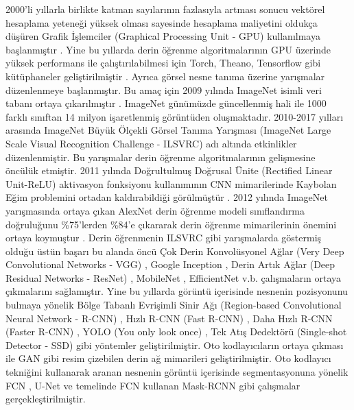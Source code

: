 2000'li yıllarla birlikte katman sayılarının fazlasıyla artması sonucu vektörel hesaplama yeteneği yüksek olması sayesinde hesaplama maliyetini oldukça düşüren Grafik İşlemciler (Graphical Processing Unit - GPU) kullanılmaya başlanmıştır \cite{raina2009large,cirecsan2010deep,sanders2010cuda}. Yine bu yıllarda derin öğrenme algoritmalarının GPU üzerinde yüksek performans ile çalıştırılabilmesi için Torch, Theano, Tensorflow gibi kütüphaneler geliştirilmiştir \cite{collobert2002torch,bergstra2010theano,abadi2016tensorflow,paszke2019pytorch}. Ayrıca görsel nesne tanıma üzerine yarışmalar düzenlenmeye başlanmıştır. Bu amaç için 2009 yılında ImageNet isimli veri tabanı ortaya çıkarılmıştır \cite{deng2009imagenet}. ImageNet günümüzde güncellenmiş hali ile 1000 farklı sınıftan 14 milyon işaretlenmiş görüntüden oluşmaktadır. 2010-2017 yılları arasında ImageNet Büyük Ölçekli Görsel Tanıma Yarışması (ImageNet Large Scale Visual Recognition Challenge - ILSVRC) adı altında etkinlikler düzenlenmiştir. Bu yarışmalar derin öğrenme algoritmalarının gelişmesine öncülük etmiştir. 2011 yılında Doğrultulmuş Doğrusal Ünite (Rectified Linear Unit-ReLU) aktivasyon fonksiyonu kullanımının CNN mimarilerinde Kaybolan Eğim problemini ortadan kaldırabildiği görülmüştür \cite{glorot2011deep}. 2012 yılında ImageNet yarışmasında ortaya çıkan AlexNet derin öğrenme modeli sınıflandırma doğruluğunu \%75'lerden \%84'e çıkararak derin öğrenme mimarilerinin önemini ortaya koymuştur \cite{krizhevsky2012imagenet}. Derin öğrenmenin ILSVRC gibi yarışmalarda göstermiş olduğu üstün başarı bu alanda öncü Çok Derin Konvolüsyonel Ağlar (Very Deep Convolutional Networks - VGG) \cite{simonyan2014very}, Google Inception \cite{szegedy2015going}, Derin Artık Ağlar (Deep Residual  Networks - ResNet) \cite{he2016deep}, MobileNet \cite{howard2017mobilenets}, EfficientNet \cite{tan2019efficientnet} v.b.  çalışmaların ortaya çıkmalarını sağlamıştır. Yine bu yıllarda görüntü içerisinde nesnenin pozisyonunu bulmaya yönelik Bölge Tabanlı Evrişimli Sinir Ağı (Region-based Convolutional Neural Network - R-CNN) \cite{girshick2014rich}, Hızlı R-CNN (Fast R-CNN)  \cite{girshick2015fast}, Daha Hızlı R-CNN (Faster R-CNN) \cite{ren2015faster}, YOLO (You only look once) \cite{redmon2016you}, Tek Atış Dedektörü (Single-shot Detector - SSD) \cite{liu2016ssd} gibi yöntemler geliştirilmiştir. Oto kodlayıcıların ortaya çıkması ile GAN \cite{goodfellow2020generative} gibi resim çizebilen derin ağ mimarileri geliştirilmiştir. Oto kodlayıcı tekniğini kullanarak aranan nesnenin görüntü içerisinde segmentasyonuna yönelik FCN \cite{long2015fully}, U-Net \cite{ronneberger2015u} ve temelinde FCN kullanan Mask-RCNN \cite{he2017mask} gibi çalışmalar gerçekleştirilmiştir.

